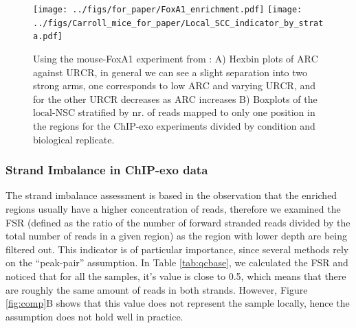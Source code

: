 \documentclass[11pt]{article}\usepackage[]{graphicx}\usepackage[]{color}
\begin{document}
\begin{figure}[H]
  \centering
  \texttt{[image: ../figs/for\_paper/FoxA1\_enrichment.pdf]}
  \texttt{[image: ../figs/Carroll\_mice\_for\_paper/Local\_SCC\_indicator\_by\_strata.pdf]}
  \caption{Using the mouse-FoxA1 experiment from \cite{exoillumina}:
    A) Hexbin plots of $\mbox{ARC}$ against $\mbox{URCR}$, in general
    we can see a slight separation into two strong arms, one
    corresponds to low $\mbox{ARC}$ and varying $\mbox{URCR}$, and for
    the other $\mbox{URCR}$ decreases as $\mbox{ARC}$ increases B)
    Boxplots of the $\mbox{local-NSC}$ stratified by nr. of reads
    mapped to only one position in the regions for the ChIP-exo
    experiments divided by condition and biological replicate.}
  \label{fig:enrich}
\end{figure}



\subsubsection{Strand Imbalance in ChIP-exo data}
\label{sec:strand_imbalance}

The strand imbalance assessment is based in the observation that the
enriched regions usually have a higher concentration of reads,
therefore we examined the FSR (defined as the ratio of the number of
forward stranded reads divided by the total number of reads in a given
region) as the region with lower depth are being filtered out. This
indicator is of particular importance, since several methods rely on
the ``peak-pair'' assumption. In Table \ref{tab:qcbase}, we calculated
the FSR and noticed that for all the samples, it's value is close to
0.5, which means that there are roughly the same amount of reads in
both strands. However, Figure \ref{fig:comp}B shows that this value
does not represent the sample locally, hence the assumption does not
hold well in practice.
\end{document}
